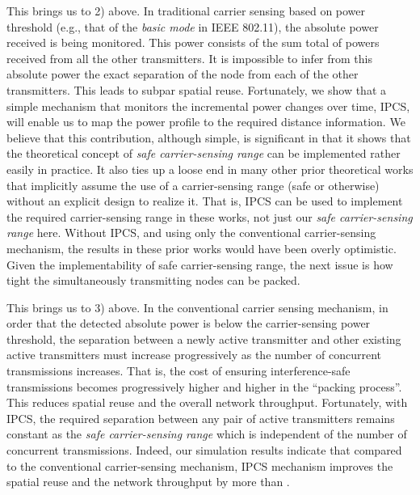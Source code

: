 \documentclass[conference]{IEEEtran}
\begin{document}
This brings us to 2) above. In traditional carrier sensing based on
power threshold (e.g., that of the \emph{basic mode} in IEEE
802.11), the absolute power received is being monitored. This power
consists of the sum total of powers received from all the other
transmitters. It is impossible to infer from this absolute power the
exact separation of the node from each of the other transmitters.
This leads to subpar spatial reuse. Fortunately, we show that a
simple mechanism that monitors the incremental power changes over
time, IPCS, will enable us to map the power prof\/ile to the
required distance information. We believe that this contribution,
although simple, is signif\/icant in that it shows that the
theoretical concept of \emph{safe carrier-sensing range} can be
implemented rather easily in practice. It also ties up a loose end
in many other prior theoretical works that implicitly assume the use
of a carrier-sensing range (safe or otherwise) without an explicit
design to realize it. That is, IPCS can be used to implement the
required carrier-sensing range in these works, not just our
\emph{safe carrier-sensing range} here. Without IPCS, and using only
the conventional carrier-sensing mechanism, the results in these
prior works would have been overly optimistic. Given the
implementability of safe carrier-sensing range, the next issue is
how tight the simultaneously transmitting nodes can be packed.



This brings us to 3) above. In the conventional carrier sensing
mechanism, in order that the detected absolute power is below the
carrier-sensing power threshold, the separation between a newly
active transmitter and other existing active transmitters must
increase progressively as the number of concurrent transmissions
increases. That is, the cost of ensuring interference-safe
transmissions becomes progressively higher and higher in the
``packing process''. This reduces spatial reuse and the overall
network throughput. Fortunately, with IPCS, the required separation
between any pair of active transmitters remains constant as the
\emph{safe carrier-sensing range} which is independent of the number
of concurrent transmissions. Indeed, our simulation results indicate
that compared to the conventional carrier-sensing mechanism, IPCS
mechanism improves the spatial reuse and the network throughput by
more than .
\end{document}
